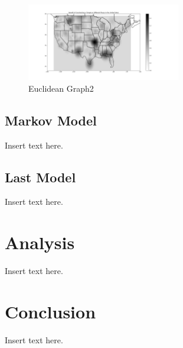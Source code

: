 \documentclass[twoside,twocolumn]{article}
\begin{document}
\begin{figure}[h!]
\centering
\includegraphics[width=0.6\textwidth]{Euclidean_Graph2}
\caption{Euclidean Graph2}
\label{fig:Results2}
\end{figure}

\subsection{Markov Model}
Insert text here.

\subsection{Last Model}
Insert text here.

\section{Analysis}
\label{sec:analysis}
Insert text here.

\section{Conclusion}
\label{sec:conclusion}
Insert text here.

\end{document}
